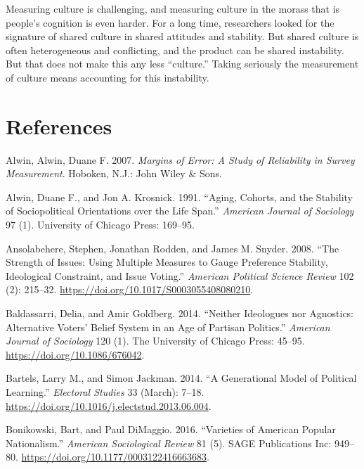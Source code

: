 \documentclass[12pt,]{article}
\begin{document}
Measuring culture is challenging, and measuring culture in the morass that is people's cognition is even harder. For a long time, researchers looked for the signature of shared culture in shared attitudes and stability. But shared culture is often heterogeneous and conflicting, and the product can be shared instability. But that does not make this any less ``culture.'' Taking seriously the measurement of culture means accounting for this instability.

\newpage

\hypertarget{references}{%
\section{References}\label{references}}

\singlespace
\setlength{\parindent}{-0.2in}
\setlength{\leftskip}{0.2in}
\setlength{\parskip}{0pt}

\noindent

\hypertarget{refs}{}
\leavevmode\hypertarget{ref-alwin2007}{}%
Alwin, Alwin, Duane F. 2007. \emph{Margins of Error: A Study of Reliability in Survey Measurement}. Hoboken, N.J.: John Wiley \& Sons.

\leavevmode\hypertarget{ref-alwin1991}{}%
Alwin, Duane F., and Jon A. Krosnick. 1991. ``Aging, Cohorts, and the Stability of Sociopolitical Orientations over the Life Span.'' \emph{American Journal of Sociology} 97 (1). University of Chicago Press: 169--95.

\leavevmode\hypertarget{ref-ansolabehere2008}{}%
Ansolabehere, Stephen, Jonathan Rodden, and James M. Snyder. 2008. ``The Strength of Issues: Using Multiple Measures to Gauge Preference Stability, Ideological Constraint, and Issue Voting.'' \emph{American Political Science Review} 102 (2): 215--32. \url{https://doi.org/10.1017/S0003055408080210}.

\leavevmode\hypertarget{ref-baldassarri2014}{}%
Baldassarri, Delia, and Amir Goldberg. 2014. ``Neither Ideologues nor Agnostics: Alternative Voters' Belief System in an Age of Partisan Politics.'' \emph{American Journal of Sociology} 120 (1). The University of Chicago Press: 45--95. \url{https://doi.org/10.1086/676042}.

\leavevmode\hypertarget{ref-bartels2014}{}%
Bartels, Larry M., and Simon Jackman. 2014. ``A Generational Model of Political Learning.'' \emph{Electoral Studies} 33 (March): 7--18. \url{https://doi.org/10.1016/j.electstud.2013.06.004}.

\leavevmode\hypertarget{ref-bonikowski2016}{}%
Bonikowski, Bart, and Paul DiMaggio. 2016. ``Varieties of American Popular Nationalism.'' \emph{American Sociological Review} 81 (5). SAGE Publications Inc: 949--80. \url{https://doi.org/10.1177/0003122416663683}.
\end{document}
